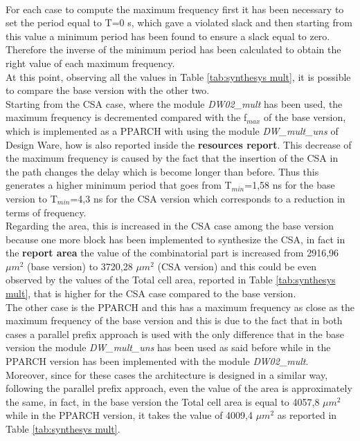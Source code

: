 \documentclass[a4paper, titlepage]{article}
\begin{document}
\\ For each case to compute the maximum frequency first it has been necessary to set the period equal to T=0 s, which gave a violated slack and then starting from this value a minimum period has been found to ensure a slack equal to zero. Therefore the inverse of the minimum period has been calculated to obtain the right value of each maximum frequency.\\At this point, observing all the values in Table \ref{tab:synthesys mult}, it is possible to compare the base version with the other two.\\Starting from the CSA case, where the module \textit{DW02\_mult} has been used, the maximum frequency is decremented compared with the f$_{max}$ of the base version, which is implemented as a PPARCH with using the module \textit{DW\_mult\_uns} of Design Ware, how is also reported inside the \textbf{resources report}. This decrease of the maximum frequency is caused by the fact that the insertion of the CSA in the path changes the delay which is become longer than before. Thus this generates a higher minimum period that goes from T$_{min}$=1,58 ns for the base version to T$_{min}$=4,3 ns for the CSA version which corresponds to a reduction in terms of frequency.
\\ Regarding the area, this is increased in the CSA case among the base version because one more block has been implemented to synthesize the CSA, in fact in the \textbf{report area} the value of the combinatorial part is increased from 2916,96 $\mu m^2$ (base version) to 3720,28 $\mu m^2$ (CSA version) and this could be even observed by the values of the Total cell area, reported in Table \ref{tab:synthesys mult}, that is higher for the CSA case compared to the base version.\\
The other case is the PPARCH and this has a maximum frequency as close as the maximum frequency of the base version and this is due to the fact that in both cases a parallel prefix approach is used with the only difference that in the base version the module \textit{DW\_mult\_uns} has been used as said before while in the PPARCH version has been implemented with the module \textit{DW02\_mult}.\\
Moreover, since for these cases the architecture is designed in a similar way, following the parallel prefix approach, even the value of the area is approximately the same, in fact, in the base version the Total cell area is equal to 4057,8 $\mu m^2$ while in the PPARCH version, it takes the value of 4009,4 $\mu m^2$ as reported in Table \ref{tab:synthesys mult}.
\end{document}
